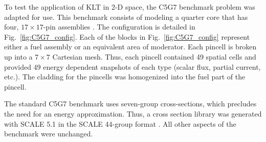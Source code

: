 \documentclass{anstrans}
\newcommand{\FIG}[1]{Fig.~\ref{#1}}               %
\begin{document}
To test the application of KLT in 2-D space, the C5G7 benchmark problem was
adapted for use.  This benchmark consists of modeling a
quarter core that has four, $17\times17$-pin
assemblies \cite{C5G7}.  The configuration is detailed in
\FIG{fig:C5G7_config}.  Each of the blocks in \FIG{fig:C5G7_config}
represent either a fuel assembly or an equivalent area of
moderator.  Each pincell is broken up into a $7\times7$
Cartesian mesh. Thus, each pincell contained 49 spatial cells and provided 49
energy dependent snapshots of each type (scalar flux, partial current, etc.).
The cladding for the pincells was
homogenized into the fuel part of the pincell.

The standard C5G7 benchmark uses seven-group cross-sections, which precludes
the need for an energy approximation.  Thus, a cross section library was
generated with SCALE 5.1 in the SCALE 44-group format \cite{Scale}.  All other
aspects of the benchmark were unchanged.
\end{document}
